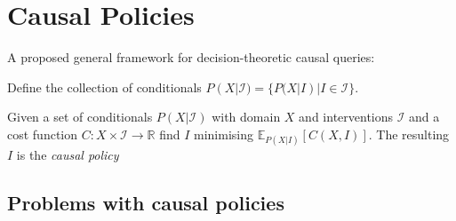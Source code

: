 \section{Causal Policies}

A proposed general framework for decision-theoretic causal queries:






Define the collection of conditionals $P(X|\mathcal{I})=\{P(X|I)|I\in\mathcal{I}\}$.

\begin{definition}\label{def:causal_query_2}
Given a set of conditionals $P(X|\mathcal{I})$ with domain $X$ and interventions $\mathcal{I}$ and a cost function $C:X\times\mathcal{I}\to\mathbb{R}$ find $I$ minimising $\mathbb{E}_{P(X|I)}[C(X,I)]$. The resulting $I$ is the \emph{causal policy}
\end{definition}

\subsection{Problems with causal policies}\label{ssec:prob_causal_policy}

